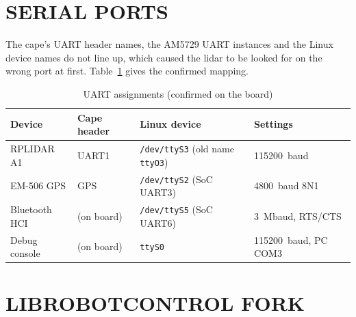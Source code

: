 \section{SERIAL PORTS}

The cape's UART header names, the AM5729 UART instances and the Linux device
names do not line up, which caused the lidar to be looked for on the wrong
port at first. Table~\ref{tab:uarts} gives the confirmed mapping.

\begin{table}[htbp]
\centering
\caption{UART assignments (confirmed on the board)}
\label{tab:uarts}
\small
\begin{tabular}{llll}
\toprule
Device & Cape header & Linux device & Settings \\
\midrule
RPLIDAR A1 & UART1 & \texttt{/dev/ttyS3} (old name \texttt{ttyO3}) & \SI{115200}{baud} \\
EM-506 GPS & GPS & \texttt{/dev/ttyS2} (SoC UART3) & \SI{4800}{baud} 8N1 \\
Bluetooth HCI & (on board) & \texttt{/dev/ttyS5} (SoC UART6) & \SI{3}{Mbaud}, RTS/CTS \\
Debug console & (on board) & \texttt{ttyS0} & \SI{115200}{baud}, PC COM3 \\
\bottomrule
\end{tabular}
\end{table}

\section{LIBROBOTCONTROL FORK}
\label{sec:rclib}

